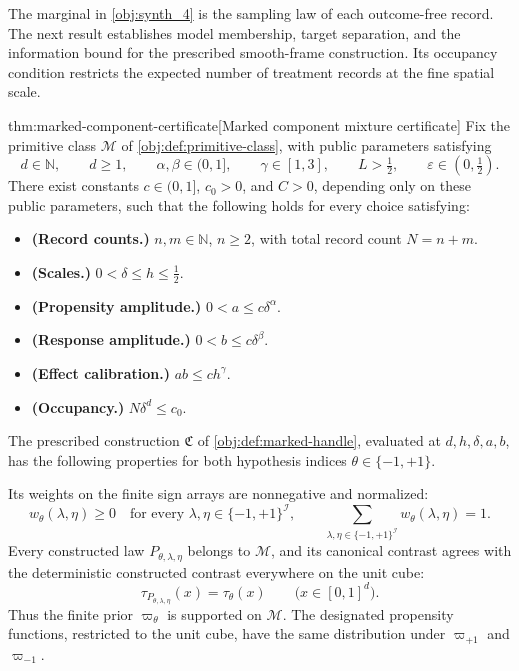 \documentclass[11pt]{article}
\begin{document}
The marginal in \cref{obj:synth_4} is the sampling law of each outcome-free record. The next result establishes model membership, target separation, and the information bound for the prescribed smooth-frame construction. Its occupancy condition restricts the expected number of treatment records at the fine spatial scale.

\begin{theoremv}{thm:marked-component-certificate}[Marked component mixture certificate]
Fix the primitive class \(\mathcal M\) of \cref{obj:def:primitive-class}, with public parameters satisfying
\[
d\in\mathbb N,\qquad d\ge1,\qquad
\alpha,\beta\in(0,1],\qquad
\gamma\in[1,3],\qquad
L>\tfrac12,\qquad
\varepsilon\in(0,\tfrac12).
\]
There exist constants \(c\in(0,1]\), \(c_0>0\), and \(C>0\), depending only on these public parameters, such that the following holds for every choice satisfying:
\begin{itemize}
\item \textbf{(Record counts.)} \(n,m\in\mathbb N\), \(n\ge2\), with total record count \(N=n+m\).
\item \textbf{(Scales.)} \(0<\delta\le h\le\tfrac12\).
\item \textbf{(Propensity amplitude.)} \(0<a\le c\delta^\alpha\).
\item \textbf{(Response amplitude.)} \(0<b\le c\delta^\beta\).
\item \textbf{(Effect calibration.)} \(ab\le ch^\gamma\).
\item \textbf{(Occupancy.)} \(N\delta^d\le c_0\).
\end{itemize}
The prescribed construction \(\mathfrak C\) of \cref{obj:def:marked-handle}, evaluated at \(d,h,\delta,a,b\), has the following properties for both hypothesis indices \(\theta\in\{-1,+1\}\).

Its weights on the finite sign arrays are nonnegative and normalized:
\[
w_\theta(\lambda,\eta)\ge0
\quad\text{for every }\lambda,\eta\in\{-1,+1\}^{\mathcal I},
\qquad
\sum_{\lambda,\eta\in\{-1,+1\}^{\mathcal I}}
w_\theta(\lambda,\eta)=1.
\]
Every constructed law \(P_{\theta,\lambda,\eta}\) belongs to \(\mathcal M\), and its canonical contrast agrees with the deterministic constructed contrast everywhere on the unit cube:
\[
\tau_{P_{\theta,\lambda,\eta}}(x)=\tau_\theta(x)
\qquad
\bigl(x\in[0,1]^d\bigr).
\]
Thus the finite prior \(\varpi_\theta\) is supported on \(\mathcal M\). The designated propensity functions, restricted to the unit cube, have the same distribution under \(\varpi_{+1}\) and \(\varpi_{-1}\).


\end{theoremv}
\end{document}
